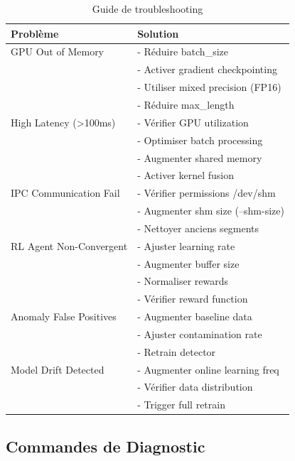 \documentclass[12pt,a4paper]{article}
\begin{document}
\begin{table}[H]
\centering
\small
\begin{tabular}{|p{5cm}|p{7cm}|}
\hline
\textbf{Problème} & \textbf{Solution} \\
\hline
GPU Out of Memory & 
- Réduire batch\_size \\
& - Activer gradient checkpointing \\
& - Utiliser mixed precision (FP16) \\
& - Réduire max\_length \\
\hline
High Latency (>100ms) & 
- Vérifier GPU utilization \\
& - Optimiser batch processing \\
& - Augmenter shared memory \\
& - Activer kernel fusion \\
\hline
IPC Communication Fail &
- Vérifier permissions /dev/shm \\
& - Augmenter shm size (--shm-size) \\
& - Nettoyer anciens segments \\
\hline
RL Agent Non-Convergent &
- Ajuster learning rate \\
& - Augmenter buffer size \\
& - Normaliser rewards \\
& - Vérifier reward function \\
\hline
Anomaly False Positives &
- Augmenter baseline data \\
& - Ajuster contamination rate \\
& - Retrain detector \\
\hline
Model Drift Detected &
- Augmenter online learning freq \\
& - Vérifier data distribution \\
& - Trigger full retrain \\
\hline
\end{tabular}
\caption{Guide de troubleshooting}
\end{table}

\subsection{Commandes de Diagnostic}
\end{document}
